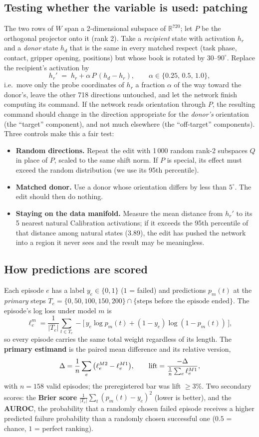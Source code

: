 \documentclass[11pt,a4paper]{article}
\begin{document}
\subsection{Testing whether the variable is used: patching}
The two rows of $W$ span a 2-dimensional subspace of $\mathbb{R}^{720}$; let $P$ be the orthogonal projector onto it (rank 2). Take a \emph{recipient} state with activation $h_r$ and a \emph{donor} state $h_d$ that is the same in every matched respect (task phase, contact, gripper opening, positions) but whose book is rotated by $30$--$90^\circ$. Replace the recipient's activation by
\[
h_r' \;=\; h_r + \alpha\, P\,(h_d - h_r), \qquad \alpha \in \{0.25,\, 0.5,\, 1.0\},
\]
i.e.\ move only the probe coordinates of $h_r$ a fraction $\alpha$ of the way toward the donor's, leave the other 718 directions untouched, and let the network finish computing its command. If the network reads orientation through $P$, the resulting command should change in the direction appropriate for the \emph{donor's} orientation (the ``target'' component), and not much elsewhere (the ``off-target'' components). Three controls make this a fair test:
\begin{itemize}
\item \textbf{Random directions.} Repeat the edit with 1\,000 random rank-2 subspaces $Q$ in place of $P$, scaled to the same shift norm. If $P$ is special, its effect must exceed the random distribution (we use its 95th percentile).
\item \textbf{Matched donor.} Use a donor whose orientation differs by less than $5^\circ$. The edit should then do nothing.
\item \textbf{Staying on the data manifold.} Measure the mean distance from $h_r'$ to its 5 nearest natural Calibration activations; if it exceeds the 95th percentile of that distance among natural states (3.89), the edit has pushed the network into a region it never sees and the result may be meaningless.
\end{itemize}

\subsection{How predictions are scored}
\label{sec:metrics}
Each episode $e$ has a label $y_e \in \{0,1\}$ ($1$ = failed) and predictions $p_m(t)$ at the \emph{primary} steps $T_e = \{0, 50, 100, 150, 200\} \cap \{\text{steps before the episode ended}\}$. The episode's log loss under model $m$ is
\[
\ell^m_e = \frac{1}{|T_e|}\sum_{t \in T_e} -\big[\,y_e \log p_m(t) + (1-y_e)\log(1-p_m(t))\,\big],
\]
so every episode carries the same total weight regardless of its length. The \textbf{primary estimand} is the paired mean difference and its relative version,
\[
\Delta = \frac{1}{n}\sum_e \big(\ell^{M2}_e - \ell^{M1}_e\big), \qquad
\text{lift} = \frac{-\Delta}{\frac{1}{n}\sum_e \ell^{M1}_e},
\]
with $n = 158$ valid episodes; the preregistered bar was lift $\geq 3\%$. Two secondary scores: the \textbf{Brier score} $\frac{1}{|T_e|}\sum_t (p_m(t) - y_e)^2$ (lower is better), and the \textbf{AUROC}, the probability that a randomly chosen failed episode receives a higher predicted failure probability than a randomly chosen successful one ($0.5$ = chance, $1$ = perfect ranking).
\end{document}

